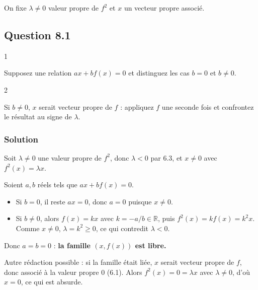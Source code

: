 \documentclass[11pt,a4paper]{article}
\providecommand{\tightlist}{\setlength{\itemsep}{0pt}\setlength{\parskip}{0pt}}
\begin{document}
On fixe \(\lambda\neq0\) valeur propre de \(f^2\) et \(x\) un vecteur propre associé.

\hypertarget{question-8.1}{%
\subsection{Question 8.1}\label{question-8.1}}

\begin{indication}{1}

Supposez une relation \(ax+bf(x)=0\) et distinguez les cas \(b=0\) et \(b\neq0\).

\end{indication}

\begin{indication}{2}

Si \(b\neq0\), \(x\) serait vecteur propre de \(f\) : appliquez \(f\) une seconde fois et confrontez le résultat au signe de \(\lambda\).

\end{indication}

\hypertarget{solution-14}{%
\subsubsection{Solution}\label{solution-14}}

Soit \(\lambda\neq0\) une valeur propre de \(f^2\), donc \(\lambda<0\) par 6.3, et \(x\neq0\) avec \(f^2(x)=\lambda x\).

Soient \(a,b\) réels tels que \(ax+bf(x)=0\).

\begin{itemize}
\tightlist
\item
  Si \(b=0\), il reste \(ax=0\), donc \(a=0\) puisque \(x\neq0\).
\item
  Si \(b\neq0\), alors \(f(x)=kx\) avec \(k=-a/b\in\mathbb R\), puis \(f^2(x)=kf(x)=k^2x\).
  Comme \(x\neq0\), \(\lambda=k^2\ge0\), ce qui contredit \(\lambda<0\).
\end{itemize}

Donc \(a=b=0\) : \textbf{la famille \((x,f(x))\) est libre.}

\begin{methode}

Autre rédaction possible : si la famille était liée, \(x\) serait vecteur propre de \(f\), donc associé à la valeur propre \(0\) (6.1). Alors \(f^2(x)=0=\lambda x\) avec \(\lambda\neq0\), d'où \(x=0\), ce qui est absurde.

\end{methode}
\end{document}
